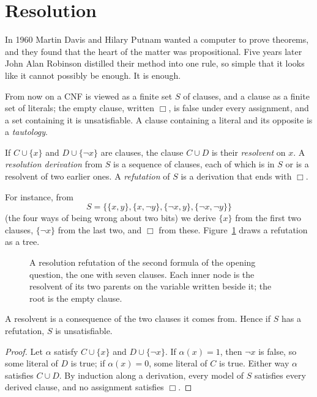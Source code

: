 \section{Resolution}\label{sec:resolution}

In 1960 Martin Davis and Hilary Putnam wanted a computer to prove theorems, and they found that the heart of the
matter was propositional. Five years later John Alan Robinson distilled their method into one rule, so simple that it
looks like it cannot possibly be enough. It is enough.

From now on a CNF is viewed as a finite set $S$ of clauses, and a clause as a finite set of literals; the empty clause,
written $\Box$, is false under every assignment, and a set containing it is unsatisfiable. A clause containing a literal
and its opposite is a \emph{tautology}.

\begin{definition}\label{def:resolution}
If $C\cup\{x\}$ and $D\cup\{\neg x\}$ are clauses, the clause $C\cup D$ is their \emph{resolvent} on $x$. A \emph{resolution derivation} from $S$
is a sequence of clauses, each of which is in $S$ or is a resolvent of two earlier ones. A \emph{refutation} of $S$ is a
derivation that ends with $\Box$.
\end{definition}

For instance, from
\[
S=\bigl\{\{x,y\},\{x,\neg y\},\{\neg x,y\},\{\neg x,\neg y\}\bigr\}
\]
(the four ways of being wrong about two bits) we derive $\{x\}$ from the
first two clauses, $\{\neg x\}$ from the last two, and $\Box$ from these. Figure~\ref{fig:resolution} draws a refutation as a tree.

\begin{figure}[ht]
\centering
{}
\caption{A resolution refutation of the second formula of the opening question, the one with seven clauses. Each inner
node is the resolvent of its two parents on the variable written beside it; the root is the empty clause.}
\label{fig:resolution}
\end{figure}

\begin{lemma}[soundness]\label{lem:sound}
A resolvent is a consequence of the two clauses it comes from. Hence if $S$ has a refutation, $S$ is unsatisfiable.
\end{lemma}
\begin{proof}
Let $\alpha$ satisfy $C\cup\{x\}$ and $D\cup\{\neg x\}$. If $\alpha(x)=1$, then $\neg x$ is false, so some literal of $D$ is true; if $\alpha(x)=0$, some
literal of $C$ is true. Either way $\alpha$ satisfies $C\cup D$. By induction along a derivation, every model of $S$ satisfies every
derived clause, and no assignment satisfies $\Box$.
\end{proof}

